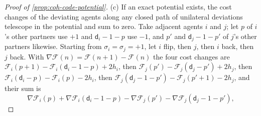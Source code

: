 \begin{proof}[Proof of \cref{prop:coh-code-potential}]
(c) If an exact potential exists, the cost changes of the deviating agents along any closed path of unilateral deviations telescope in the potential and sum to zero. Take adjacent agents $i$ and $j$; let $p$ of $i$'s other partners use $+1$ and $\mathsf d_i-1-p$ use $-1$, and $p'$ and $\mathsf d_j-1-p'$ of $j$'s other partners likewise. Starting from $\sigma_i=\sigma_j=+1$, let $i$ flip, then $j$, then $i$ back, then $j$ back. With $\nabla\mathcal F(n)=\mathcal F(n+1)-\mathcal F(n)$ the four cost changes are $\mathcal F_i(p+1)-\mathcal F_i(\mathsf d_i-1-p)+2h_i$, then $\mathcal F_j(p')-\mathcal F_j(\mathsf d_j-p')+2h_j$, then $\mathcal F_i(\mathsf d_i-p)-\mathcal F_i(p)-2h_i$, then $\mathcal F_j(\mathsf d_j-1-p')-\mathcal F_j(p'+1)-2h_j$, and their sum is
\[ \nabla\mathcal F_i(p)+\nabla\mathcal F_i(\mathsf d_i-1-p)-\nabla\mathcal F_j(p')-\nabla\mathcal F_j(\mathsf d_j-1-p'), \]

\end{proof}
